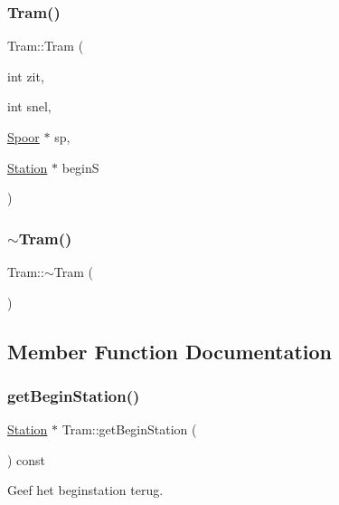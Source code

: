 \subsubsection{\texorpdfstring{Tram()}{Tram()}\hspace{0.1cm}{\footnotesize\ttfamily [2/2]}}
{\footnotesize\ttfamily Tram\+::\+Tram (\begin{DoxyParamCaption}\item[{int}]{zit,  }\item[{int}]{snel,  }\item[{\hyperlink{class_spoor}{Spoor} $\ast$}]{sp,  }\item[{\hyperlink{class_station}{Station} $\ast$}]{beginS }\end{DoxyParamCaption})}

\mbox{\label{class_tram_acd6056d2289f2dccd371bc226cd2cb17}} 
\subsubsection{\texorpdfstring{$\sim$\+Tram()}{~Tram()}}
{\footnotesize\ttfamily Tram\+::$\sim$\+Tram (\begin{DoxyParamCaption}{ }\end{DoxyParamCaption})\hspace{0.3cm}{\ttfamily [virtual]}}



\subsection{Member Function Documentation}
\mbox{\label{class_tram_abe386592de6a7930df75ea184b945403}} 
\subsubsection{\texorpdfstring{get\+Begin\+Station()}{getBeginStation()}}
{\footnotesize\ttfamily \hyperlink{class_station}{Station} $\ast$ Tram\+::get\+Begin\+Station (\begin{DoxyParamCaption}{ }\end{DoxyParamCaption}) const}



Geef het beginstation terug. 

